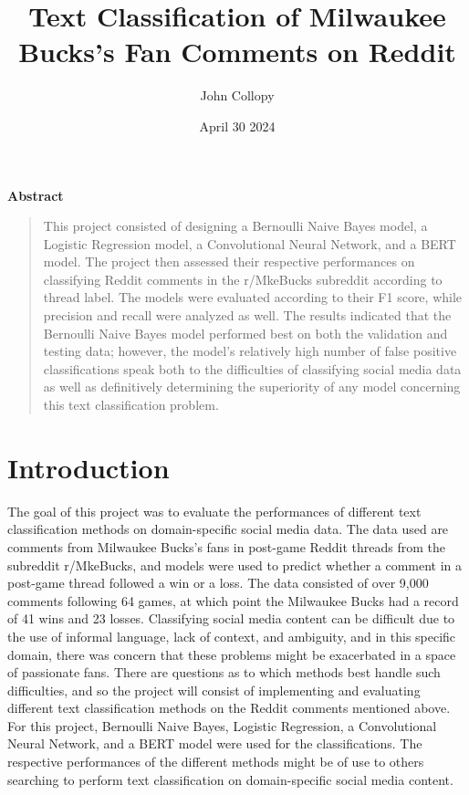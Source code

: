 \documentclass[twocolumn]{article}
\title{Text Classification of Milwaukee Bucks's Fan Comments on Reddit}
\author{John Collopy}
\date{April 30 2024}
\begin{document}
\maketitle


\begin{center}
\textbf{Abstract}
\end{center}

\begin{quote}
This project consisted of designing a Bernoulli Naive Bayes model, a Logistic Regression model, a Convolutional Neural Network, and a BERT model. The project then assessed their respective performances on classifying Reddit comments in the r/MkeBucks subreddit according to thread label. The models were evaluated according to their F1 score, while precision and recall were analyzed as well. The results indicated that the Bernoulli Naive Bayes model performed best on both the validation and testing data; however, the model's relatively high number of false positive classifications speak both to the difficulties of classifying social media data as well as definitively determining the superiority of any model concerning this text classification problem.
\end{quote}

\section{Introduction}

The goal of this project was to evaluate the performances of different text classification methods on domain-specific social media data. The data used are comments from Milwaukee Bucks's fans in post-game Reddit threads from the subreddit r/MkeBucks, and models were used to predict whether a comment in a post-game thread followed a win or a loss. The data consisted of over 9,000 comments following 64 games, at which point the Milwaukee Bucks had a record of 41 wins and 23 losses. Classifying social media content can be difficult due to the use of informal language, lack of context, and ambiguity, and in this specific domain, there was concern that these problems might be exacerbated in a space of passionate fans. There are questions as to which methods best handle such difficulties, and so the project will consist of implementing and evaluating different text classification methods on the Reddit comments mentioned above. For this project, Bernoulli Naive Bayes, Logistic Regression, a Convolutional Neural Network, and a BERT model were used for the classifications. The respective performances of the different methods might be of use to others searching to perform text classification on domain-specific social media content.
\end{document}
